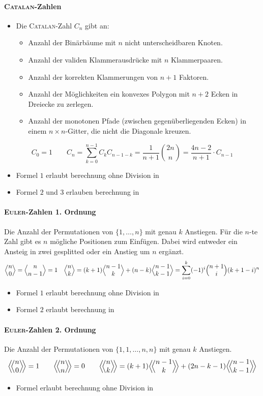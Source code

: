 \paragraph{\textsc{Catalan}-Zahlen}
\begin{itemize}
	\item Die \textsc{Catalan}-Zahl $C_n$ gibt an:
	\begin{itemize}
		\item Anzahl der Binärbäume mit $n$ nicht unterscheidbaren Knoten.
		\item Anzahl der validen Klammerausdrücke mit $n$ Klammerpaaren.
		\item Anzahl der korrekten Klammerungen von $n+1$ Faktoren.
		\item Anzahl der Möglichkeiten ein konvexes Polygon mit $n + 2$ Ecken in Dreiecke zu zerlegen.
		\item Anzahl der monotonen Pfade (zwischen gegenüberliegenden Ecken) in
		einem $n \times n$-Gitter, die nicht die Diagonale kreuzen.
	\end{itemize}
\end{itemize}
\[C_0 = 1\qquad C_n = \sum\limits_{k = 0}^{n - 1} C_kC_{n - 1 - k} =
\frac{1}{n + 1}\binom{2n}{n} = \frac{4n - 2}{n+1} \cdot C_{n-1}\]
\begin{itemize}
	\item Formel $1$ erlaubt berechnung ohne Division in 
	\item Formel $2$ und $3$ erlauben berechnung in 
\end{itemize}

\paragraph{\textsc{Euler}-Zahlen 1. Ordnung}
Die Anzahl der Permutationen von $\{1, \ldots, n\}$ mit genau $k$ Anstiegen.
Für die $n$-te Zahl gibt es $n$ mögliche Positionen zum Einfügen.
Dabei wird entweder ein Ansteig in zwei gesplitted oder ein Anstieg um $n$ ergänzt.
\[\Bigl\langle \begin{matrix} n \\ 0 \end{matrix} \Bigr\rangle = \Bigl\langle \begin{matrix} n \\ n-1 \end{matrix} \Bigr\rangle = 1 \quad
\Bigl\langle \begin{matrix} n \\ k \end{matrix} \Bigr\rangle = (k+1) \Bigl\langle \begin{matrix} n-1 \\ k \end{matrix} \Bigr\rangle + (n-k) \Bigl\langle \begin{matrix} n-1 \\ k-1 \end{matrix} \Bigr\rangle=
\sum_{i=0}^{k} (-1)^i\Bigl( \begin{matrix} n+1 \\ i \end{matrix} \Bigr)(k+1-i)^n\]
\begin{itemize}
	\item Formel $1$ erlaubt berechnung ohne Division in 
	\item Formel $2$ erlaubt berechnung in 
\end{itemize}

\paragraph{\textsc{Euler}-Zahlen 2. Ordnung}
Die Anzahl der Permutationen von $\{1,1, \ldots, n,n\}$ mit genau $k$ Anstiegen.
\[\eulerII{n}{0} = 1 \qquad\eulerII{n}{n} = 0 \qquad\eulerII{n}{k} = (k+1) \eulerII{n-1}{k} + (2n-k-1) \eulerII{n-1}{k-1}\]
\begin{itemize}
	\item Formel erlaubt berechnung ohne Division in 
\end{itemize}

